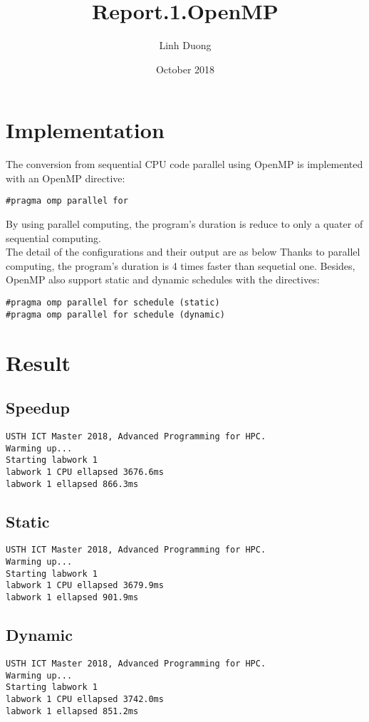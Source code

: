 \documentclass{article}
\title{Report.1.OpenMP}
\author{Linh Duong}
\date{October 2018}
\begin{document}
\maketitle
\section{Implementation}
The conversion from sequential CPU code parallel using OpenMP is implemented with an OpenMP directive:
\begin{verbatim}
#pragma omp parallel for
\end{verbatim}

By using parallel computing, the program's duration is reduce to only a quater of sequential computing.\\
The detail of the configurations and their output are as below
Thanks to parallel computing, the program's duration is 4 times faster than sequetial one. Besides, OpenMP also support static and dynamic schedules with the directives:
\begin{verbatim}
#pragma omp parallel for schedule (static)
#pragma omp parallel for schedule (dynamic)
\end{verbatim}

\section{Result}
\subsection{Speedup}
\begin{verbatim}
USTH ICT Master 2018, Advanced Programming for HPC.
Warming up...
Starting labwork 1
labwork 1 CPU ellapsed 3676.6ms
labwork 1 ellapsed 866.3ms
\end{verbatim}

\subsection{Static}
\begin{verbatim}
USTH ICT Master 2018, Advanced Programming for HPC.
Warming up...
Starting labwork 1
labwork 1 CPU ellapsed 3679.9ms
labwork 1 ellapsed 901.9ms

\end{verbatim}

\subsection{Dynamic}
\begin{verbatim}
USTH ICT Master 2018, Advanced Programming for HPC.
Warming up...
Starting labwork 1
labwork 1 CPU ellapsed 3742.0ms
labwork 1 ellapsed 851.2ms

\end{verbatim}
\end{document}

